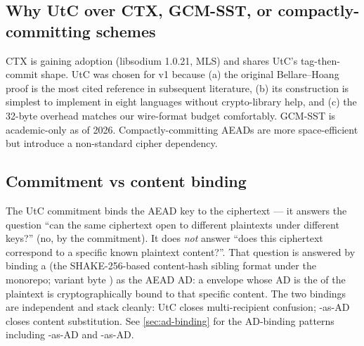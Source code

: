 \subsection{Why UtC over CTX, GCM-SST, or compactly-committing schemes}

CTX \citep{chan2022commit} is gaining adoption (libsodium 1.0.21, MLS) and shares UtC's tag-then-commit shape. UtC was chosen for v1 because (a) the original Bellare--Hoang proof is the most cited reference in subsequent literature, (b) its construction is simplest to implement in eight languages without crypto-library help, and (c) the 32-byte overhead matches our wire-format budget comfortably. GCM-SST \citep{bellare2024gcmsst} is academic-only as of 2026. Compactly-committing AEADs \citep{grubbs2017aead} are more space-efficient but introduce a non-standard cipher dependency.

\subsection{Commitment vs content binding}

The UtC commitment binds the AEAD key to the ciphertext --- it answers the question ``can the same ciphertext open to different plaintexts under different keys?'' (no, by the commitment). It does \emph{not} answer ``does this ciphertext correspond to a specific known plaintext content?''. That question is answered by binding a \pqhash{} (the SHAKE-256-based content-hash sibling format under the \pqtoolkit{} monorepo; variant byte ) as the AEAD AD: a \pqcrypt{} envelope whose AD is the \pqhash{} of the plaintext is cryptographically bound to that specific content. The two bindings are independent and stack cleanly: UtC closes multi-recipient confusion; \pqhash{}-as-AD closes content substitution. See \cref{sec:ad-binding} for the AD-binding patterns including \pqid{}-as-AD and \pqhash{}-as-AD.
